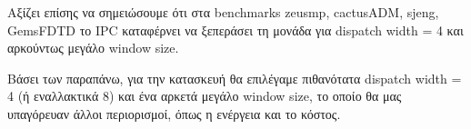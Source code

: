    Αξίζει επίσης να σημειώσουμε ότι στα benchmarks zeusmp, cactusADM, sjeng,
   GemsFDTD το IPC καταφέρνει να ξεπεράσει τη μονάδα για dispatch width = 4 και
   αρκούντως μεγάλο window size.

   Βάσει των παραπάνω, για την κατασκευή θα επιλέγαμε πιθανότατα dispatch width =
   4 (ή εναλλακτικά 8) και ένα αρκετά μεγάλο window size, το οποίο θα μας υπαγόρευαν άλλοι
   περιορισμοί, όπως η ενέργεια και το κόστος.